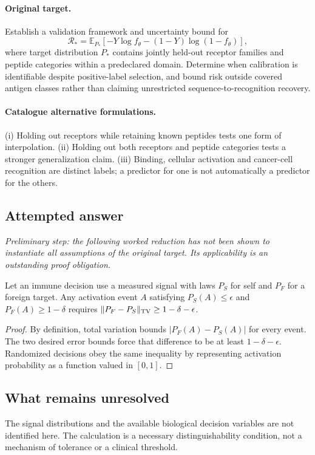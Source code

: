 \documentclass[11pt]{article}
\begin{document}
\paragraph{Original target.}
Establish a validation framework and uncertainty bound for
    \[\mathcal R_*=\mathbb{E}_{P_*}[-Y\log f_\theta-(1-Y)\log(1-f_\theta)],\]
    where target distribution $P_*$ contains jointly held-out receptor families and peptide categories within a predeclared domain. Determine when calibration is identifiable despite positive-label selection, and bound risk outside covered antigen classes rather than claiming unrestricted sequence-to-recognition recovery.
\paragraph{Catalogue alternative formulations.}
(i) Holding out receptors while retaining known peptides tests one form of interpolation. (ii) Holding out both receptors and peptide categories tests a stronger generalization claim. (iii) Binding, cellular activation and cancer-cell recognition are distinct labels; a predictor for one is not automatically a predictor for the others.
\subsection{Attempted answer}
\noindent\emph{Preliminary step: the following worked reduction has not been shown to instantiate all assumptions of the original target. Its applicability is an outstanding proof obligation.}

\begin{proposition}
Let an immune decision use a measured signal with laws $P_S$ for self and $P_F$ for a foreign target. Any activation event $A$ satisfying $P_S(A)\leq\epsilon$ and $P_F(A)\geq1-\delta$ requires $\|P_F-P_S\|_{\rm TV}\geq1-\delta-\epsilon$.
\end{proposition}
\begin{proof}
By definition, total variation bounds $|P_F(A)-P_S(A)|$ for every event. The two desired error bounds force that difference to be at least $1-\delta-\epsilon$. Randomized decisions obey the same inequality by representing activation probability as a function valued in $[0,1]$.
\end{proof}
\subsection{What remains unresolved}
The signal distributions and the available biological decision variables are not identified here. The calculation is a necessary distinguishability condition, not a mechanism of tolerance or a clinical threshold.
\end{document}
